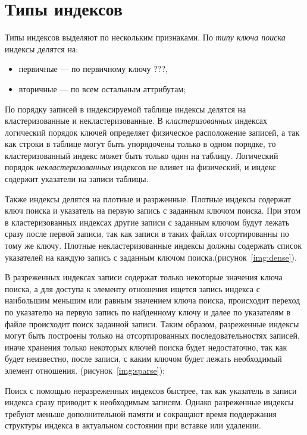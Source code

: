 \section{Типы индексов}

Типы индексов выделяют по нескольким признаками. По \textit{типу ключа поиска}
индексы делятся на: 
    \begin{itemize}
        \item первичные --- по первичному ключу ???,
        \item вторичные --- по всем остальным аттрибутам;
    \end{itemize}

По порядку записей в индексируемой таблице индексы делятся на кластеризованные и
некластеризованные.  В \textit{кластеризованных} индексах логический порядок
ключей определяет физическое расположение записей, а так как строки в таблице
могут быть упорядочены только в одном порядке, то кластеризованный индекс может
быть только один на таблицу. Логический порядок \textit{некластеризованных}
индексов не влияет на физический, и индекс содержит указатели на записи
таблицы.

Также индексы делятся на плотные и разрженные. Плотные индексы содержат ключ
поиска и указатель на первую запись с заданным ключом поиска. При этом в
кластеризованных индексах другие записи с заданным ключом будут лежать сразу после
первой записи, так как записи в таких файлах отсортированны по тому же ключу.
Плотные некластеризованные индексы должны содержать список указателей на каждую
запись с заданным ключом поиска.(рисунок~\ref{img:dense}).
 

В разреженных индексах записи содержат только некоторые значения ключа поиска, а
для доступа к элементу отношения ищется запись индекса с наибольшим меньшим или
равным значением ключа поиска, происходит переход по указателю на первую запись
по найденному ключу и далее по указателям в файле происходит поиск заданной
записи. Таким образом, разреженные индексы могут быть построены только на
отсортированных последовательностях записей, иначе хранения только некоторых
ключей поиска будет недостаточно, так как будет неизвестно, после записи, с
каким ключом будет лежать необходимый элемент отношения.
(рисунок~\ref{img:sparse});


Поиск с помощью неразреженных индексов быстрее, так как указатель в записи
индекса сразу приводит к необходимым записям. Однако разреженные индексы требуют
меньше дополнительной памяти и сокращают время поддержания структуры индекса в
актуальном состоянии при вставке или удалении.

